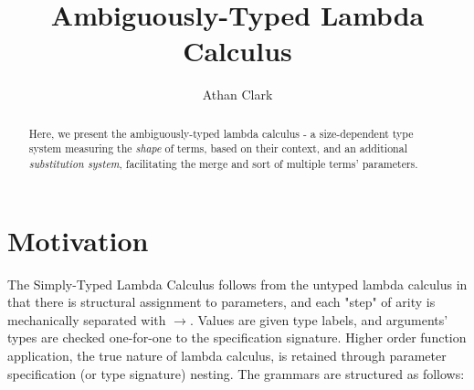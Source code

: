 \documentclass{article}
\begin{document}
\title{Ambiguously-Typed Lambda Calculus}

\author{Athan Clark}

\date{}

\maketitle

\begin{abstract}
\begin{flushleft}
Here, we present the ambiguously-typed lambda calculus - a size-dependent type
system measuring the \textit{shape} of terms, based on their context, and an
additional \textit{substitution system}, facilitating the merge and sort of
multiple terms' parameters.
\end{flushleft}
\end{abstract}


\section{Motivation}

The Simply-Typed Lambda Calculus follows from the untyped lambda calculus in that
there is structural assignment to parameters, and each "step" of arity is
mechanically separated with $\rightarrow$. Values are given type labels, and
arguments' types are checked one-for-one to the specification signature. Higher
order function application, the true nature of lambda calculus, is retained
through parameter specification (or type signature) nesting. The grammars are
structured as follows:
\end{document}
